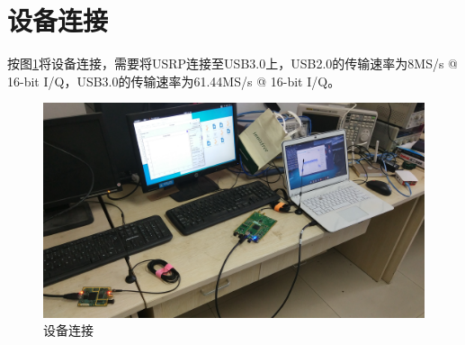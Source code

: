	\section{设备连接}
		\par 按图\ref{fig:devices}将设备连接，需要将USRP连接至USB3.0上，USB2.0的传输速率为8MS/s @ 16-bit I/Q，USB3.0的传输速率为61.44MS/s @ 16-bit I/Q\cite{USRP:SamplingRates}。
		\begin{figure}[htp]
			\centering
			\includegraphics[width=13cm]{figures/devices.jpg}
			\caption{设备连接}
			\label{fig:devices}
		\end{figure}
